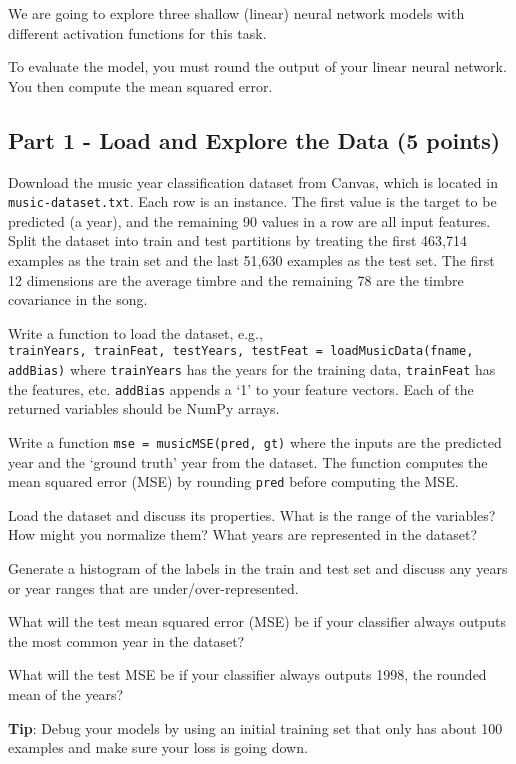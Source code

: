\documentclass[11pt, oneside]{article}   	%
\begin{document}
We are going to explore three shallow (linear) neural network models with different activation functions for this task.

To evaluate the model, you must round the output of your linear neural network. You then compute the mean squared error.


\subsection*{Part 1 - Load and Explore the Data (5 points)}

Download the music year classification dataset from Canvas, which is located in \texttt{music-dataset.txt}. 
Each row is an instance. The first value is the target to be predicted (a year), and the remaining 90 values in a row are all input features. Split the dataset into train and test partitions by treating the first 463,714 examples as the train set and the last 51,630 examples as the test set.  The first 12 dimensions are the average timbre and the remaining 78 are the timbre covariance in the song.


Write a function to load the dataset, e.g., \\ \texttt{trainYears, trainFeat, testYears, testFeat = loadMusicData(fname, addBias)} where \texttt{trainYears} has the years for the training data, \texttt{trainFeat} has the features, etc. \texttt{addBias} appends a `1' to your feature vectors.  Each of the returned variables should be NumPy arrays.

Write a function \texttt{mse = musicMSE(pred, gt)} where the inputs are the predicted year and the `ground truth' year from the dataset. The function computes the mean squared error (MSE) by rounding \texttt{pred} before computing the MSE.


Load the dataset and discuss its properties.  What is the range of the variables? How might you normalize them? What years are represented in the dataset?

Generate a histogram of the labels in the train and test set and discuss any years or year ranges that are under/over-represented.

What will the test mean squared error (MSE) be if your classifier always outputs the most common year in the dataset? 

What will the test MSE be if your classifier always outputs 1998, the rounded mean of the years?



\textbf{Tip}: Debug your models by using an initial training set that only has about 100 examples and make sure your loss is going down.
\end{document}
